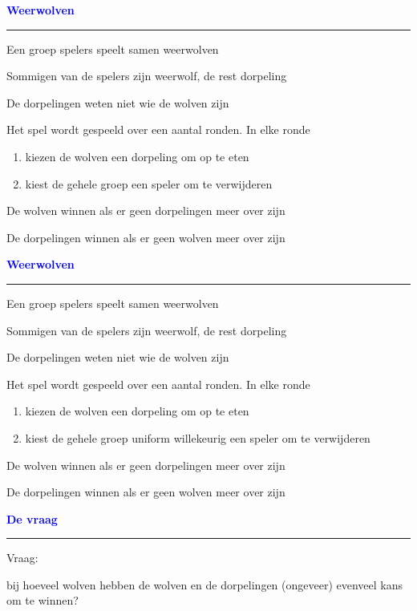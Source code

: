 \documentclass{beamer}
\def\lbt{} %
\newenvironment{dia}[2]
{
	\begin{frame}
	\vspace{1mm}
	{\small #1}
	\hfill
    {\small\bf\textcolor{blue}{#2}}
	\vspace{3mm}
	\hrule
	\bigskip
}
{
	\vfill
	\end{frame}
}
\begin{document}
\begin{dia}{\lbt}{Weerwolven}
Een groep spelers speelt samen weerwolven \pause \bigskip

Sommigen van de spelers zijn weerwolf, de rest dorpeling \smallskip

De dorpelingen weten niet wie de wolven zijn \pause \bigskip

Het spel wordt gespeeld over een aantal ronden. In elke ronde \pause
\begin{enumerate}[(1)]
    \item kiezen de wolven een dorpeling om op te eten \pause
    \item kiest de gehele groep een speler om te verwijderen \pause
\end{enumerate}
\bigskip

De wolven winnen als er geen dorpelingen meer over zijn \smallskip

De dorpelingen winnen als er geen wolven meer over zijn
\vspace{5mm}
\end{dia}

\begin{dia}{\lbt}{Weerwolven}
Een groep spelers speelt samen weerwolven \bigskip

Sommigen van de spelers zijn weerwolf, de rest dorpeling \smallskip

De dorpelingen weten niet wie de wolven zijn \bigskip

Het spel wordt gespeeld over een aantal ronden. In elke ronde
\begin{enumerate}[(1)]
    \item kiezen de wolven een dorpeling om op te eten
    \item kiest de gehele groep {\color{mygreen} uniform willekeurig} een speler om te verwijderen
\end{enumerate}
\bigskip

De wolven winnen als er geen dorpelingen meer over zijn \smallskip

De dorpelingen winnen als er geen wolven meer over zijn
\end{dia}

\begin{dia}{\lbt}{De vraag}
\vspace{2cm}
\begin{center}
    {\color{mygreen} Vraag}: \bigskip
    
    bij hoeveel wolven hebben de wolven en de dorpelingen (ongeveer) evenveel kans om te winnen?
\end{center}

\vspace{1.5cm}
\end{dia}
\end{document}

